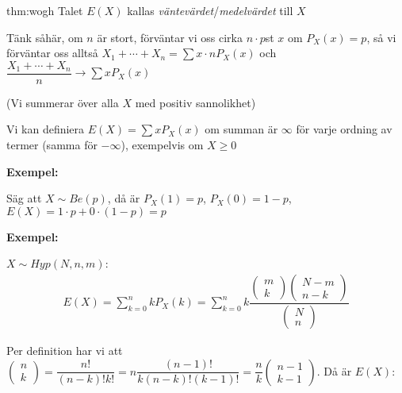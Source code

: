 \par\bigskip
\begin{theo}{thm:wogh}
  Talet $E(X)$ kallas \textit{väntevärdet}/\textit{medelvärdet} till $X$
\end{theo}
\par\bigskip
\noindent Tänk såhär, om $n$ är stort, förväntar vi oss cirka $n\cdot p$st $x$ om $P_X(x) = p$, så vi förväntar oss alltså $X_1+\cdots+X_n = \sum x\cdot nP_X(x)$ och $\dfrac{X_1+\cdots+X_n}{n}\to\sum xP_X(x)$\par
\noindent (Vi summerar över alla $X$ med positiv sannolikhet)
\par\bigskip
\noindent Vi kan definiera $E(X) = \sum xP_X(x)$ om summan är $\infty$ för varje ordning av termer (samma för $-\infty$), exempelvis om $X\geq0$
\par\bigskip
\noindent\textbf{Exempel:}\par
\noindent Säg att $X\sim Be(p)$, då är $P_X(1)=p$, $P_X(0)=1-p$, $E(X) = 1\cdot p + 0\cdot(1-p) = p$
\par\bigskip
\noindent\textbf{Exempel:}\par
\noindent $X\sim Hyp(N,n,m)$:
\begin{equation*}
  \begin{gathered}
    E(X) = \sum_{k=0}^{n}kP_X(k) = \sum_{k=0}^{n}k\dfrac{\begin{pmatrix}m\\k\end{pmatrix}\begin{pmatrix}N-m\\n-k\end{pmatrix}}{\begin{pmatrix}N\\n\end{pmatrix}}
  \end{gathered}
\end{equation*}
\par\bigskip
\noindent Per definition har vi att $\begin{pmatrix}n\\k\end{pmatrix} = \dfrac{n!}{(n-k)!k!} = n\dfrac{(n-1)!}{k(n-k)!(k-1)!} = \dfrac{n}{k}\begin{pmatrix}n-1\\k-1\end{pmatrix}$. Då är $E(X)$:
